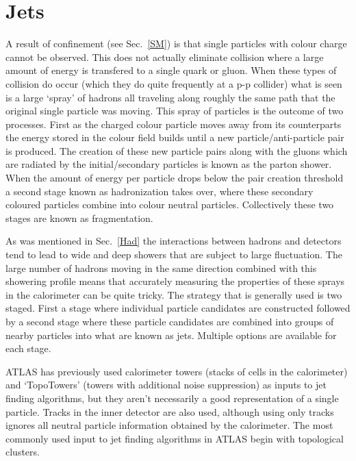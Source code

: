 \section{Jets}
\label{jets}

A result of confinement (see Sec.~\ref{SM}) is that single particles with colour charge cannot be observed.  
This does not actually eliminate collision where a large amount of energy is transfered to a single quark or gluon.  
When these types of collision do occur (which they do quite frequently at a p-p collider) what is seen is a large `spray' of hadrons all traveling along roughly the same path that the original single particle was moving.  
This spray of particles is the outcome of two processes.  
First as the charged colour particle moves away from its counterparts the energy stored in the colour field builds until a new particle/anti-particle pair is produced.  
The creation of these new particle pairs along with the gluons which are radiated by the initial/secondary particles is known as the parton shower.  
When the amount of energy per particle drops below the pair creation threshold a second stage known as hadronization takes over, where these secondary coloured particles combine into colour neutral particles.  
Collectively these two stages are known as fragmentation.  

As was mentioned in Sec.~\ref{Had} the interactions between hadrons and detectors tend to lead to wide and deep showers that are subject to large fluctuation.  
The large number of hadrons moving in the same direction combined with this showering profile means that accurately measuring the properties of these sprays in the calorimeter can be quite tricky.  
The strategy that is generally used is two staged.  
First a stage where individual particle candidates are constructed followed by a second stage where these particle candidates are combined into groups of nearby particles into what are known as jets.  
Multiple options are available for each stage.  

ATLAS has previously used calorimeter towers (stacks of cells in the calorimeter) and `TopoTowers' (towers with additional noise suppression) as inputs to jet finding algorithms, but they aren't necessarily a good representation of a single particle.  
Tracks in the inner detector are also used, although using only tracks ignores all neutral particle information obtained by the calorimeter.  
The most commonly used input to jet finding algorithms in ATLAS begin with topological clusters.  
 
